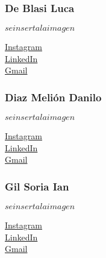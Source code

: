 \documentclass{article}
\begin{document}
\subsubsection{De Blasi Luca}

\begin{minipage}[t]{0.3\textwidth}

    $se inserta la imagen$

\end{minipage}
\begin{minipage}[t]{0.5\textwidth}
    \vspace{3.5em}
    \href{https://instagram.com/luca.deblasii}{Instagram} \\[1em]
    \href{https://www.linkedin.com/in/luca-de-blasi-31164b304}{LinkedIn} \\[1em]
    \href{mailto:luqac2006@gmail.com}{Gmail}
\end{minipage}%

\subsubsection{Diaz Melión Danilo}

\begin{minipage}[t]{0.3\textwidth}

    $se inserta la imagen$

\end{minipage}
\begin{minipage}[t]{0.5\textwidth}
    \vspace{3.5em}
    \href{https://instagram.com/_danilodiaz}{Instagram} \\[1em]
    \href{https://www.linkedin.com/in/danilodiazmelion/}{LinkedIn} \\[1em]
    \href{mailto:danilodiaz934@gmail.com}{Gmail}
\end{minipage}%

\subsubsection{Gil Soria Ian}
\begin{minipage}[t]{0.3\textwidth}

    $se inserta la imagen$

\end{minipage}
\begin{minipage}[t]{0.5\textwidth}
    \vspace{3.5em}
    \href{https://instagram.com/ian_gilsooor}{Instagram} \\[1em]
     \href{https://www.linkedin.com/in/ian-lucas-gil-soria-a8090b2a8?utm_source=share&utm_campaign=share_via&utm_content=profile&utm_medium=android_app}{LinkedIn} \\[1em]
    \href{mailto:ianlucasgilsoria@gmail.com}{Gmail}
\end{minipage}%
\end{document}
